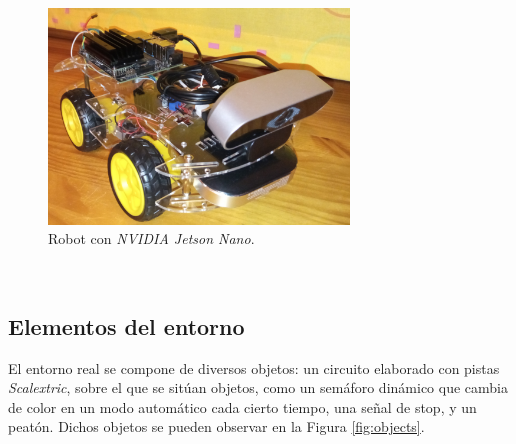 \begin{figure} [h!]
	\begin{center}
		\includegraphics[width=8cm]{figs/robot}
	\end{center}
	\caption{Robot con \textit{NVIDIA Jetson Nano}.}
	\label{fig:realrobot}
\end{figure}\

\subsection{Elementos del entorno}
El entorno real se compone de diversos objetos: un circuito elaborado con pistas \textit{Scalextric}, sobre el que se sitúan objetos, como un semáforo dinámico que cambia de color en un modo automático cada cierto tiempo, una señal de stop, y un peatón. Dichos objetos se pueden observar en la Figura \ref{fig:objects}.\\


